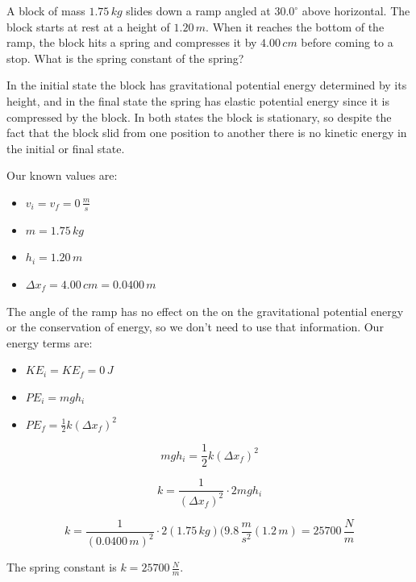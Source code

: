 \documentclass[12pt]{book}
\begin{document}
\begin{exampleblock}

A block of mass $1.75 \, kg$ slides down a ramp angled at $30.0^{\circ}$ above horizontal. The block starts at rest at a height of $1.20 \, m$. When it reaches the bottom of the ramp, the block hits a spring and compresses it by $4.00 \, cm$ before coming to a stop. What is the spring constant of the spring?

\hspace{10pt}

In the initial state the block has gravitational potential energy determined by its height, and in the final state the spring has elastic potential energy since it is compressed by the block. In both states the block is stationary, so despite the fact that the block slid from one position to another there is no kinetic energy in the initial or final state.

Our known values are:

\begin{itemize}
\item $v_i = v_f = 0 \, \frac{m}{s}$
\item $m = 1.75 \, kg$
\item $h_i = 1.20 \, m$
\item $\Delta x_f = 4.00 \, cm = 0.0400 \, m$
\end{itemize}

The angle of the ramp has no effect on the on the gravitational potential energy or the conservation of energy, so we don't need to use that information. Our energy terms are:

\begin{itemize}
\item $KE_i = KE_f = 0 \, J$
\item $PE_i = mgh_i$
\item $PE_f = \frac{1}{2} k (\Delta x_f)^2$
\end{itemize}

\begin{equation}
mgh_i = \frac{1}{2} k (\Delta x_f)^2
\end{equation}

\begin{equation}
k = \frac{1}{(\Delta x_f)^2} \cdot 2mgh_i
\end{equation}

\begin{equation}
k = \frac{1}{(0.0400 \, m)^2} \cdot 2 (1.75 \, kg) (9.8 \, \frac{m}{s^2} (1.2 \, m) = 25700 \, \frac{N}{m}
\end{equation}

The spring constant is $k = 25700 \, \frac{N}{m}$.

\end{exampleblock}
\end{document}

